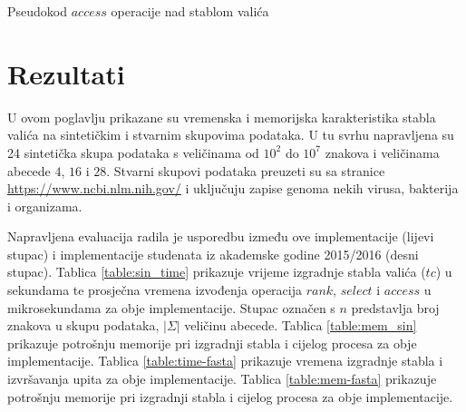 \documentclass[times, utf8, seminar, numeric]{fer}
\begin{document}
\begin{algorithm}[H]
 \caption{Pseudokod $access$ operacije nad stablom valića}
 \label{alg:wt-access}
\end{algorithm}


\chapter{Rezultati}
\label{sec:results}

U ovom poglavlju prikazane su vremenska i memorijska karakteristika stabla valića na sintetičkim i 
stvarnim skupovima podataka. U tu svrhu napravljena su 24 sintetička skupa podataka s veličinama
od $10^2$ do $10^7$ znakova i veličinama abecede $4$, $16$ i $28$. Stvarni skupovi podataka preuzeti 
su sa stranice \url{https://www.ncbi.nlm.nih.gov/} i uključuju zapise genoma nekih virusa, bakterija 
i organizama. 

Napravljena evaluacija radila je usporedbu između ove implementacije (lijevi stupac) i implementacije studenata iz akademske godine 2015/2016 (desni stupac). 
Tablica \ref{table:sin_time} prikazuje vrijeme izgradnje stabla valića ($tc$) u sekundama te prosječna vremena izvođenja operacija $rank$, $select$ i $access$ u mikrosekundama za obje implementacije. Stupac označen s $n$ predstavlja broj znakova u skupu podataka, $|\Sigma|$ veličinu abecede.  
Tablica \ref{table:mem_sin} prikazuje potrošnju memorije pri izgradnji stabla i cijelog procesa za obje implementacije. 
Tablica \ref{table:time-fasta} prikazuje vremena izgradnje stabla i izvršavanja upita za obje implementacije. 
Tablica \ref{table:mem-fasta} prikazuje potrošnju memorije pri izgradnji stabla i cijelog procesa za obje implementacije.
\end{document}
